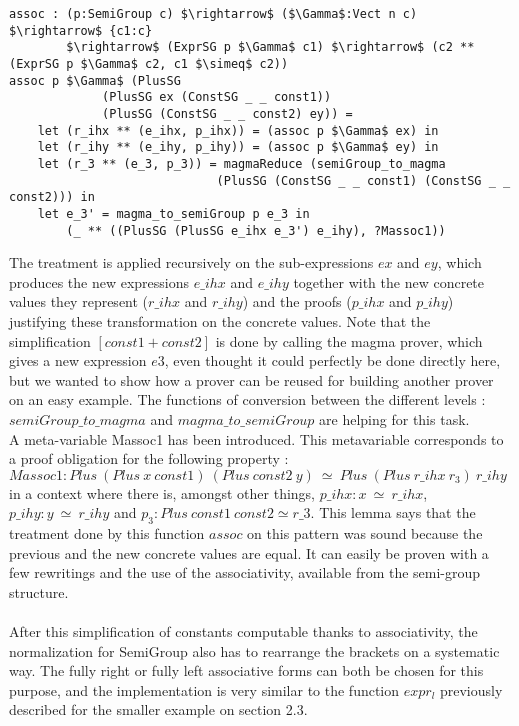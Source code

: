 \begin{lstlisting}
assoc : (p:SemiGroup c) $\rightarrow$ ($\Gamma$:Vect n c) $\rightarrow$ {c1:c} 
        $\rightarrow$ (ExprSG p $\Gamma$ c1) $\rightarrow$ (c2 ** (ExprSG p $\Gamma$ c2, c1 $\simeq$ c2))
assoc p $\Gamma$ (PlusSG 
             (PlusSG ex (ConstSG _ _ const1)) 
             (PlusSG (ConstSG _ _ const2) ey)) =
    let (r_ihx ** (e_ihx, p_ihx)) = (assoc p $\Gamma$ ex) in
    let (r_ihy ** (e_ihy, p_ihy)) = (assoc p $\Gamma$ ey) in
    let (r_3 ** (e_3, p_3)) = magmaReduce (semiGroup_to_magma 
                             (PlusSG (ConstSG _ _ const1) (ConstSG _ _ const2))) in
    let e_3' = magma_to_semiGroup p e_3 in
        (_ ** ((PlusSG (PlusSG e_ihx e_3') e_ihy), ?Massoc1))
\end{lstlisting}

The treatment is applied recursively on the sub-expressions $ex$ and $ey$, which produces the new expressions $e\_ihx$ and $e\_ihy$ together with the new concrete values they represent ($r\_ihx$ and $r\_ihy$) and the proofs ($p\_ihx$ and $p\_ihy$) justifying these transformation on the concrete values. Note that the simplification $[const1+const2]$ is done by calling the magma prover, which gives a new expression $e3$, even thought it could perfectly be done directly here, but we wanted to show how a prover can be reused for building another prover on an easy example. The functions of conversion between the different levels : $semiGroup\_to\_magma$ and $magma\_to\_semiGroup$ are helping for this task.
\\
A meta-variable Massoc1 has been introduced. This metavariable corresponds to a proof obligation for the following property :
$Massoc1 : Plus\ (Plus\ x\ const1)\ (Plus\ const2\ y)\ \simeq\ Plus\ (Plus\ r\_ihx\ r_3)\ r\_ihy$ in a context where there is, amongst other things, $p\_ihx : x\ \simeq\ r\_ihx$, $p\_ihy : y\ \simeq\ r\_ihy$ and $p_3 : Plus\ const1\ const2 \simeq r\_3$.
This lemma says that the treatment done by this function $assoc$ on this pattern was sound because the previous and the new concrete values are equal. It can easily be proven with a few rewritings and the use of the associativity, available from the semi-group structure. \\
\\
After this simplification of constants computable thanks to associativity, the normalization for SemiGroup also has to rearrange the brackets on a systematic way. The fully right or fully left associative forms can both be chosen for this purpose, and the implementation is very similar to the function $expr_l$ previously described for the smaller example on section 2.3.

